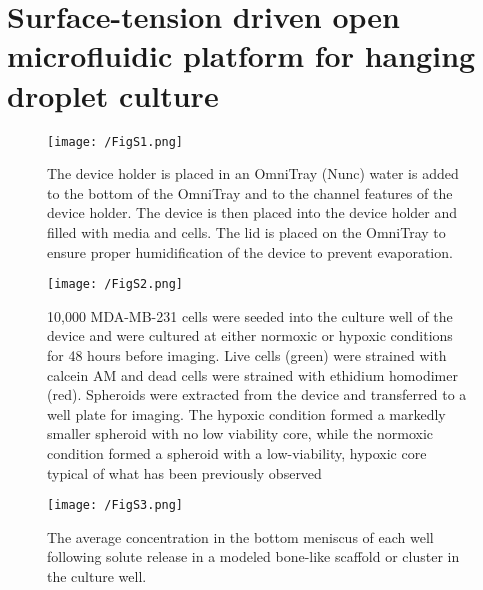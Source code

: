 \chapter{Surface-tension driven open microfluidic platform for hanging droplet culture}
\label{App:HangingDroplet}

\begin{figure}[ht] %
\centering
\texttt{[image: /FigS1.png]}
\caption[\textbf{Device holder drawing}]{The device holder is placed in an OmniTray (Nunc) water is added to the bottom of the OmniTray and to the channel features of the device holder. The device is then placed into the device holder and filled with media and cells. The lid is placed on the OmniTray to ensure proper humidification of the device to prevent evaporation.}
\label{figure:FigS1}
\end{figure}

\begin{figure}[ht] %
\centering
\texttt{[image: /FigS2.png]}
\caption[\textbf{Spheroid culture with adherent cell types}]{10,000 MDA-MB-231 cells were seeded into the culture well of the device and were cultured at either normoxic or hypoxic conditions for 48 hours before imaging. Live cells (green) were strained with calcein AM and dead cells were strained with ethidium homodimer (red). Spheroids were extracted from the device and transferred to a well plate for imaging. The hypoxic condition formed a markedly smaller spheroid with no low viability core, while the normoxic condition formed a spheroid with a low-viability, hypoxic core typical of what has been previously observed}
\label{figure:FigS2}
\end{figure}

\begin{figure}[ht] %
\centering
\texttt{[image: /FigS3.png]}
\caption[\textbf{Diffusion of soluble factors in droplet from bone or liquid culture}]{The average concentration in the bottom meniscus of each well following solute release in a modeled bone-like scaffold or cluster in the culture well.}
\label{figure:FigS3}
\end{figure}